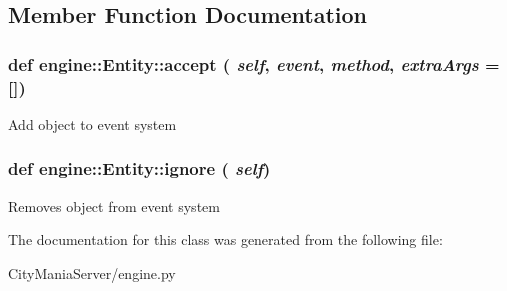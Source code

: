 \subsection{Member Function Documentation}
\hypertarget{classengine_1_1Entity_ac78a90d44e6f52363a45fe9775611ba4}{
\subsubsection[{accept}]{\setlength{\rightskip}{0pt plus 5cm}def engine::Entity::accept ( {\em self}, \/   {\em event}, \/   {\em method}, \/   {\em extraArgs} = {\ttfamily \mbox{[}\mbox{]}})}}
\label{classengine_1_1Entity_ac78a90d44e6f52363a45fe9775611ba4}
\begin{DoxyVerb}
Add object to event system
\end{DoxyVerb}
 \hypertarget{classengine_1_1Entity_aa621f5f2bf52c66dafd8406978e0c11b}{
\subsubsection[{ignore}]{\setlength{\rightskip}{0pt plus 5cm}def engine::Entity::ignore ( {\em self})}}
\label{classengine_1_1Entity_aa621f5f2bf52c66dafd8406978e0c11b}
\begin{DoxyVerb}
Removes object from event system
\end{DoxyVerb}
 

The documentation for this class was generated from the following file:\begin{DoxyCompactItemize}
\item 
CityManiaServer/engine.py\end{DoxyCompactItemize}
